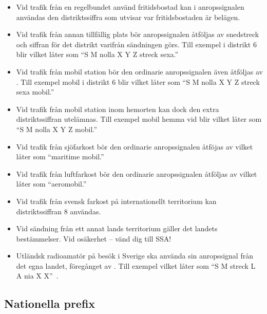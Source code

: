 \begin{itemize}
\item Vid trafik från en regelbundet använd fritidsbostad kan i
  anropssignalen användas den distriktssiffra som utvisar var
  fritidsbostaden är belägen.

\item Vid trafik från annan tillfällig plats bör anropssignalen
  åtföljas av snedstreck och siffran för det distrikt varifrån
  sändningen görs. Till exempel  i distrikt 6 blir 
  vilket låter som ``S M nolla X Y Z streck sexa.''

\item Vid trafik från mobil station bör den ordinarie anropssignalen
  även åtföljas av . Till exempel  mobil i distrikt 6 blir  vilket låter som ``S M nolla X Y Z streck sexa mobil.''

\item Vid trafik från mobil station inom hemorten kan dock den extra
  distriktssiffran utelämnas.  Till exempel  mobil hemma vid blir  vilket låter som ``S M nolla X Y Z mobil.''

\item Vid trafik från sjöfarkost bör den ordinarie anropssignalen
  åtföjas av  vilket låter som ``maritime mobil.''

\item Vid trafik från luftfarkost bör den ordinarie anropssignalen
  åtföljas av  vilket låter som ``aeromobil.''

\item Vid trafik från svensk farkost på internationellt territorium
 kan distriktssiffran 8 användas.

\item Vid sändning från ett annat lands territorium gäller det landets
  bestämmelser.
  Vid osäkerhet -- vänd dig till SSA!

\item Utländsk radioamatör på besök i Sverige ska använda sin
  anropssignal från det egna landet, föregånget av . Till exempel  vilket låter som ``S M streck L A nia X X''~\cite{TR6101}.
\end{itemize}

\subsection{Nationella prefix}

